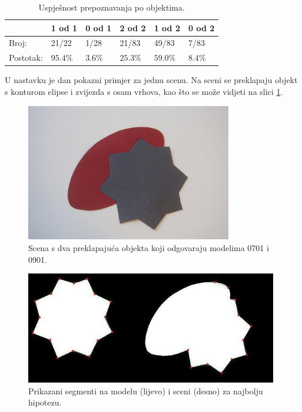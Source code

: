 \documentclass[lmodern, utf8, seminar, numeric]{fer}
\begin{document}
\begin{table}[htb]
\centering
\caption{Uspješnost prepoznavanja po objektima.}
\label{tbl:po-obj}
\begin{tabular}{l l l l l l}
\toprule
 & 1 od 1 & 0 od 1 & 2 od 2 & 1 od 2 & 0 od 2\\
\midrule
Broj: & 21/22 & 1/28 & 21/83 & 49/83 & 7/83\\
Postotak: & $95.4\%$ & $3.6\%$ & $25.3\%$ & $59.0\%$ & $8.4\%$\\
\bottomrule
\end{tabular}
\end{table}

U nastavku je dan pokazni primjer za jednu scenu. Na sceni se preklapaju objekt
s konturom elipse i zvijezda s osam vrhova, kao što se može vidjeti na slici \ref{fig:scena-preklapanja}.

\begin{figure}[!h]
\begin{center}
\includegraphics[width=9cm]{resources/spoj.png}
\end{center}
\caption{Scena s dva preklapajuća objekta koji odgovaraju modelima 0701 i 0901.} 
\label{fig:scena-preklapanja}
\end{figure}

\begin{figure}[!h]
\begin{center}
\includegraphics[width=11cm]{resources/zvijezda-spoj.png}
\end{center}
\caption{Prikazani segmenti na modelu (lijevo) i sceni (desno) za najbolju hipotezu.} 
\label{fig:segmenti-na-modelu}
\end{figure}
\end{document}

